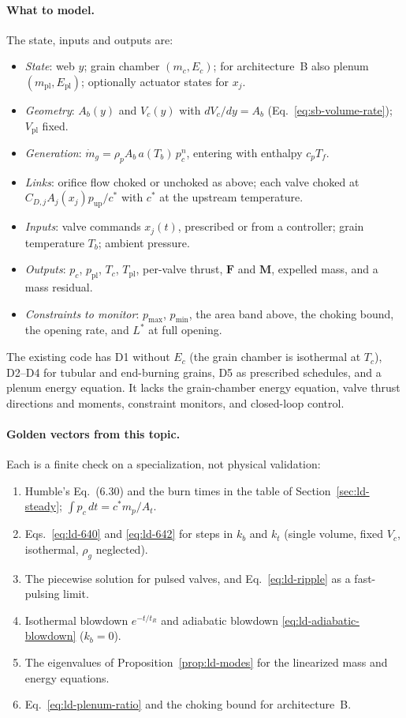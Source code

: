 \paragraph{What to model.} The state, inputs and outputs are:
\begin{itemize}
\item[D1] \emph{State}: web $y$; grain chamber $(m_c,E_c)$; for
architecture~B also plenum $(m_{\mathrm{pl}},E_{\mathrm{pl}})$;
optionally actuator states for $x_j$.
\item[D2] \emph{Geometry}: $A_b(y)$ and $V_c(y)$ with
$dV_c/dy=A_b$ (Eq.~\eqref{eq:sb-volume-rate}); $V_{\mathrm{pl}}$ fixed.
\item[D3] \emph{Generation}: $\dot m_g=\rho_pA_b\,a(T_b)\,p_c^n$,
entering with enthalpy $c_pT_f$.
\item[D4] \emph{Links}: orifice flow choked or unchoked as above; each
valve choked at $C_{D,j}A_j(x_j)p_{\mathrm{up}}/c^*$ with $c^*$ at the
upstream temperature.
\item[D5] \emph{Inputs}: valve commands $x_j(t)$, prescribed or from a
controller; grain temperature $T_b$; ambient pressure.
\item[D6] \emph{Outputs}: $p_c$, $p_{\mathrm{pl}}$, $T_c$,
$T_{\mathrm{pl}}$, per-valve thrust, $\mathbf F$ and $\mathbf M$,
expelled mass, and a mass residual.
\item[D7] \emph{Constraints to monitor}: $p_{\max}$, $p_{\min}$, the
area band above, the choking bound, the opening rate, and $L^*$ at
full opening.
\end{itemize}
The existing code has D1 without $E_c$ (the grain chamber is
isothermal at $T_c$), D2--D4 for tubular and end-burning grains, D5
as prescribed schedules, and a plenum energy equation. It lacks the
grain-chamber energy equation, valve thrust directions and moments,
constraint monitors, and closed-loop control.

\paragraph{Golden vectors from this topic.} Each is a finite check on
a specialization, not physical validation:
\begin{enumerate}
\item Humble's Eq.~(6.30) and the burn times in the table of
Section~\ref{sec:ld-steady}; $\int p_c\,dt=c^*m_p/A_t$.
\item Eqs.~\eqref{eq:ld-640} and \eqref{eq:ld-642} for steps in
$k_b$ and $k_t$ (single volume, fixed $V_c$, isothermal,
$\rho_g$ neglected).
\item The piecewise solution for pulsed valves, and
Eq.~\eqref{eq:ld-ripple} as a fast-pulsing limit.
\item Isothermal blowdown $e^{-t/t_R}$ and adiabatic blowdown
\eqref{eq:ld-adiabatic-blowdown} ($k_b=0$).
\item The eigenvalues of Proposition~\ref{prop:ld-modes} for the
linearized mass and energy equations.
\item Eq.~\eqref{eq:ld-plenum-ratio} and the choking bound for
architecture~B.
\end{enumerate}

